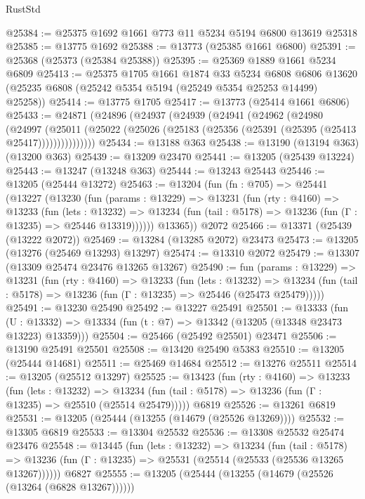\begin{lexlean}{RustStd}
\begin{coremodule}
@25384 := @25375 @1692 @1661 @773 @11 @5234 @5194 @6800 @13619 @25318
@25385 := @13775 @1692
@25388 := @13773 (@25385 @1661 @6800)
@25391 := @25368 (@25373 (@25384 @25388))
@25395 := @25369 @1889 @1661 @5234 @6809
@25413 := @25375
    @1705
    @1661
    @1874
    @33
    @5234
    @6808
    @6806
    @13620
    (@25235 @6808 (@25242 @5354 @5194 (@25249 @5354 @25253 @14499) @25258))
@25414 := @13775 @1705
@25417 := @13773 (@25414 @1661 @6806)
@25433 := @24871
    (@24896
      (@24937
        (@24939
          (@24941
            (@24962
              (@24980
                (@24997
                  (@25011
                    (@25022 (@25026 (@25183 (@25356 (@25391 (@25395 (@25413 @25417)))))))))))))))
@25434 := @13188 @363
@25438 := @13190 (@13194 @363) (@13200 @363)
@25439 := @13209 @23470
@25441 := @13205 (@25439 @13224)
@25443 := @13247 (@13248 @363)
@25444 := @13243 @25443
@25446 := @13205 (@25444 @13272)
@25463 := @13204
    (fun (fn : @705) =>
    @25441
      (@13227
        (@13230
          (fun (params : @13229) =>
          @13231
            (fun (rty : @4160) =>
            @13233
              (fun (lets : @13232) =>
              @13234 (fun (tail : @5178) => @13236 (fun (Γ : @13235) => @25446 @13319))))))
        @13365))
    @2072
@25466 := @13371 (@25439 (@13222 @2072))
@25469 := @13284 (@13285 @2072) @23473
@25473 := @13205 (@13276 (@25469 @13293) @13297)
@25474 := @13310 @2072
@25479 := @13307 (@13309 @25474 @23476 @13265 @13267)
@25490 := fun (params : @13229) =>
  @13231
    (fun (rty : @4160) =>
    @13233
      (fun (lets : @13232) =>
      @13234 (fun (tail : @5178) => @13236 (fun (Γ : @13235) => @25446 (@25473 @25479)))))
@25491 := @13230 @25490
@25492 := @13227 @25491
@25501 := @13333
    (fun (U : @13332) => @13334 (fun (t : @7) => @13342 (@13205 (@13348 @23473 @13223) @13359)))
@25504 := @25466 (@25492 @25501) @23471
@25506 := @13190 @25491 @25501
@25508 := @13420 @25490 @5383
@25510 := @13205 (@25444 @14681)
@25511 := @25469 @14684
@25512 := @13276 @25511
@25514 := @13205 (@25512 @13297)
@25525 := @13423
    (fun (rty : @4160) =>
    @13233
      (fun (lets : @13232) =>
      @13234 (fun (tail : @5178) => @13236 (fun (Γ : @13235) => @25510 (@25514 @25479)))))
    @6819
@25526 := @13261 @6819
@25531 := @13205 (@25444 (@13255 (@14679 (@25526 @13269))))
@25532 := @13305 @6819
@25533 := @13304 @25532
@25536 := @13308 @25532 @25474 @23476
@25548 := @13445
    (fun (lets : @13232) =>
    @13234
      (fun (tail : @5178) =>
      @13236 (fun (Γ : @13235) => @25531 (@25514 (@25533 (@25536 @13265 @13267))))))
    @6827
@25555 := @13205 (@25444 (@13255 (@14679 (@25526 (@13264 (@6828 @13267))))))

\end{coremodule}
\end{lexlean}

